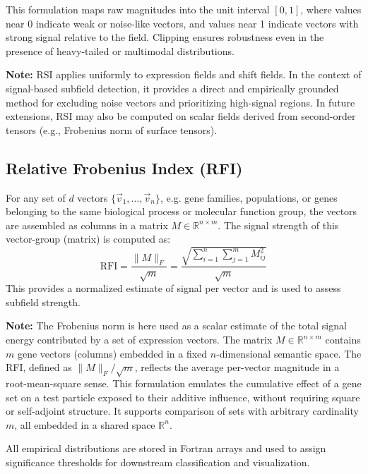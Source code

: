 \documentclass{article}
\begin{document}
This formulation maps raw magnitudes into the unit interval \([0, 1]\), where values near 0 indicate weak or noise-like vectors, and values near 1 indicate vectors with strong signal relative to the field. Clipping ensures robustness even in the presence of heavy-tailed or multimodal distributions.

\textbf{Note:} RSI applies uniformly to expression fields and shift fields. In the context of signal-based subfield detection, it provides a direct and empirically grounded method for excluding noise vectors and prioritizing high-signal regions. In future extensions, RSI may also be computed on scalar fields derived from second-order tensors (e.g., Frobenius norm of surface tensors).

\subsection{Relative Frobenius Index (RFI)}

For any set of $d$ vectors \( \{ \vec{v}_1, \dots, \vec{v}_n \} \), e.g. gene
families, populations, or genes belonging to the same biological process or
molecular function group, the vectors are assembled as columns in a matrix
\( M \in \mathbb{R}^{n \times m} \). The signal strength of this vector-group
(matrix) is computed as:
\[
\text{RFI} = \frac{\|M\|_F}{\sqrt{m}} = \frac{\sqrt{\sum_{i=1}^{n} \sum_{j=1}^{m} M_{ij}^2}}{\sqrt{m}}
\]
This provides a normalized estimate of signal per vector and is used to assess
subfield strength.

\textbf{Note:} The Frobenius norm is here used as a scalar estimate of the
total signal energy contributed by a set of expression vectors. The matrix \( M
\in \mathbb{R}^{n \times m} \) contains \( m \) gene vectors (columns) embedded
in a fixed \( n \)-dimensional semantic space. The RFI, defined as \( \|M\|_F /
\sqrt{m} \), reflects the average per-vector magnitude in a root-mean-square
sense. This formulation emulates the cumulative effect of a gene set on a test
particle exposed to their additive influence, without requiring square or
self-adjoint structure. It supports comparison of sets with arbitrary
cardinality \( m \), all embedded in a shared space \( \mathbb{R}^n \).

\vspace{2em}

All empirical distributions are stored in Fortran arrays and used to assign
significance thresholds for downstream classification and visualization.
\end{document}
